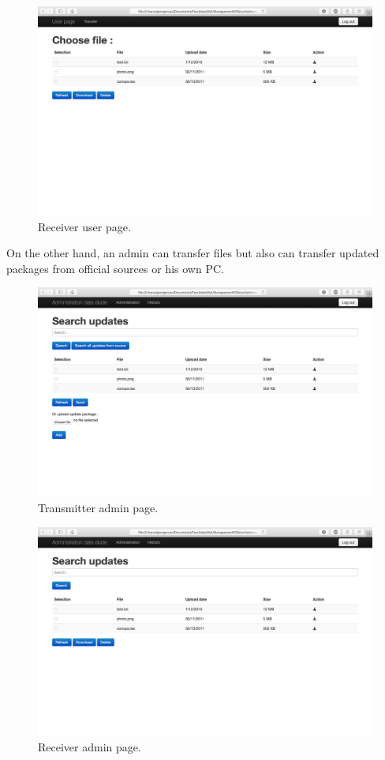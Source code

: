 \documentclass[a4paper,10pt]{article}
\begin{document}
\begin{figure}[!h]
\centering
\includegraphics[scale=0.35]{images/userreceiver.png}
\caption{Receiver user page.}
\label{fig:receiveruserpage}
\end{figure}

On the other hand, an admin can transfer files but also can transfer updated packages from official sources or his own PC.

\begin{figure}[!h]
\centering
\includegraphics[scale=0.35]{images/admintransmitter.png}
\caption{Transmitter admin page.}
\label{fig:transadminpage}
\end{figure}

\begin{figure}[!h]
\centering
\includegraphics[scale=0.35]{images/adminreceiver.png}
\caption{Receiver admin page.}
\label{fig:receiveradminpage}
\end{figure}
\clearpage
\end{document}
